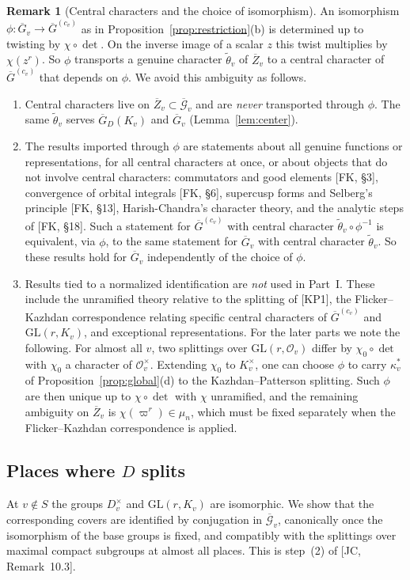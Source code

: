 \documentclass[12pt]{article}
\newcommand{\ov}[1]{\overline{#1}}
\newcommand{\cO}{\mathcal{O}}
\newcommand{\GL}{\mathrm{GL}}
\newcommand{\Gb}{\ov{G}}
\newcommand{\Zb}{\ov{Z}}
\newcommand{\GDb}{\ov{G}_D}
\newcommand{\ks}{\kappa^{*}}
\newcommand{\cGb}{\ov{\mathcal{G}}}
\theoremstyle{plain}
\theoremstyle{definition}
\newtheorem{remark}[theorem]{Remark}
\begin{document}
\begin{remark}[Central characters and the choice of isomorphism]\label{rem:chidet}
An isomorphism $\phi:\Gb_v\to\Gb^{(c_v)}$ as in Proposition~\ref{prop:restriction}(b) is determined up to twisting by $\chi\circ\det$. On the inverse image of a scalar $z$ this twist multiplies by $\chi(z^r)$. So $\phi$ transports a genuine character $\tilde\theta_v$ of $\Zb_v$ to a central character of $\Gb^{(c_v)}$ that depends on $\phi$. We avoid this ambiguity as follows.
\begin{enumerate}[label=(\arabic*)]
\item Central characters live on $\Zb_v\subset\cGb_v$ and are \emph{never} transported through $\phi$. The same $\tilde\theta_v$ serves $\GDb(K_v)$ and $\Gb_v$ (Lemma~\ref{lem:center}).
\item The results imported through $\phi$ are statements about all genuine functions or representations, for all central characters at once, or about objects that do not involve central characters: commutators and good elements [FK, \S3], convergence of orbital integrals [FK, \S6], supercusp forms and Selberg's principle [FK, \S13], Harish-Chandra's character theory, and the analytic steps of [FK, \S18]. Such a statement for $\Gb^{(c_v)}$ with central character $\tilde\theta_v\circ\phi^{-1}$ is equivalent, via $\phi$, to the same statement for $\Gb_v$ with central character $\tilde\theta_v$. So these results hold for $\Gb_v$ independently of the choice of $\phi$.
\item Results tied to a normalized identification are \emph{not} used in Part~I. These include the unramified theory relative to the splitting of [KP1], the Flicker--Kazhdan correspondence relating specific central characters of $\Gb^{(c_v)}$ and $\GL(r,K_v)$, and exceptional representations. For the later parts we note the following. For almost all $v$, two splittings over $\GL(r,\cO_v)$ differ by $\chi_0\circ\det$ with $\chi_0$ a character of $\cO_v^\times$. Extending $\chi_0$ to $K_v^\times$, one can choose $\phi$ to carry $\ks_v$ of Proposition~\ref{prop:global}(d) to the Kazhdan--Patterson splitting. Such $\phi$ are then unique up to $\chi\circ\det$ with $\chi$ unramified, and the remaining ambiguity on $\Zb_v$ is $\chi(\varpi^r)\in\mu_n$, which must be fixed separately when the Flicker--Kazhdan correspondence is applied.
\end{enumerate}
\end{remark}

\subsection{Places where $D$ splits}\label{subsec:outsideS}
At $v\notin S$ the groups $D_v^\times$ and $\GL(r,K_v)$ are isomorphic. We show that the corresponding covers are identified by conjugation in $\cGb_v$, canonically once the isomorphism of the base groups is fixed, and compatibly with the splittings over maximal compact subgroups at almost all places. This is step~(2) of [JC, Remark~10.3].
\end{document}
